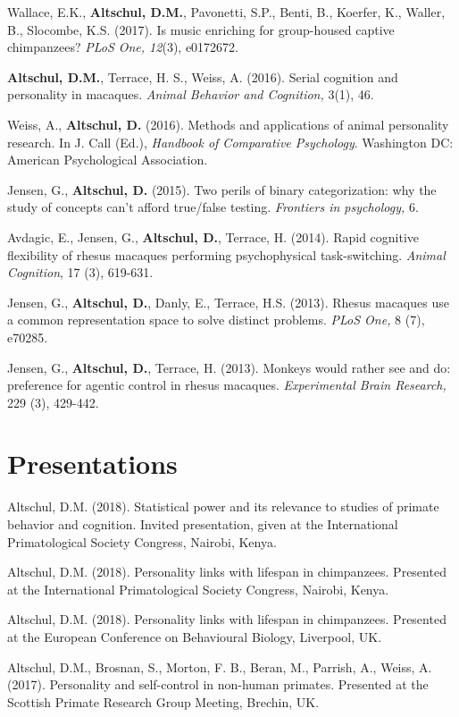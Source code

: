 \documentclass[margin,line]{res}
\begin{document}
\begin{resume}
Wallace, E.K., {\bf Altschul, D.M.}, Pavonetti, S.P., Benti, B., Koerfer, K., Waller, B., Slocombe, K.S. (2017). Is music enriching for group-housed captive chimpanzees?  {\it PLoS One, 12}(3), e0172672.

{\bf Altschul, D.M.}, Terrace, H. S., Weiss, A. (2016). Serial cognition and personality in macaques. {\it Animal Behavior and Cognition,} 3(1), 46.

Weiss, A., {\bf Altschul, D.} (2016). Methods and applications of animal personality research. In J. Call (Ed.), {\it Handbook of Comparative Psychology}. Washington DC: American Psychological Association.

Jensen, G., {\bf Altschul, D.} (2015). Two perils of binary categorization: why the study of concepts can't afford true/false testing. {\it Frontiers in psychology,} 6.

Avdagic, E., Jensen, G., {\bf Altschul, D.}, Terrace, H. (2014). Rapid cognitive flexibility of rhesus macaques performing psychophysical task-switching. {\it Animal Cognition}, 17 (3), 619-631.

Jensen, G., {\bf Altschul, D.}, Danly, E., Terrace, H.S. (2013). Rhesus macaques use a common representation space to solve distinct problems. {\it PLoS One,} 8 (7), e70285.

Jensen, G., {\bf Altschul, D.}, Terrace, H. (2013). Monkeys would rather see and do: preference for agentic control in rhesus macaques. {\it Experimental Brain Research,} 229 (3), 429-442.

\vspace{0.7cm}

\section{\sc Presentations} 

Altschul, D.M. (2018). Statistical power and its relevance to studies of primate behavior and cognition. Invited presentation, given at the International Primatological Society Congress, Nairobi, Kenya.

Altschul, D.M. (2018). Personality links with lifespan in chimpanzees. Presented at the International Primatological Society Congress, Nairobi, Kenya.

Altschul, D.M. (2018). Personality links with lifespan in chimpanzees. Presented at the European Conference on Behavioural Biology, Liverpool, UK.

Altschul, D.M., Brosnan, S., Morton, F. B., Beran, M., Parrish, A., Weiss, A. (2017). Personality and self-control in non-human primates. Presented at the Scottish Primate Research Group Meeting, Brechin, UK.


\end{resume}
\end{document}
